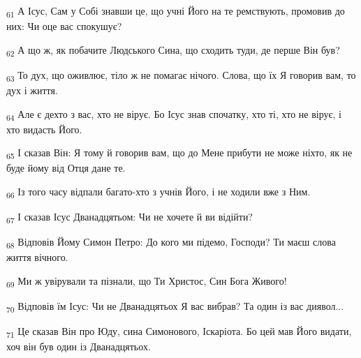 \begin{tcolorbox}
\textsubscript{61} А Ісус, Сам у Собі знавши це, що учні Його на те ремствують, промовив до них: Чи оце вас спокушує?
\end{tcolorbox}
\begin{tcolorbox}
\textsubscript{62} А що ж, як побачите Людського Сина, що сходить туди, де перше Він був?
\end{tcolorbox}
\begin{tcolorbox}
\textsubscript{63} То дух, що оживлює, тіло ж не помагає нічого. Слова, що їх Я говорив вам, то дух і життя.
\end{tcolorbox}
\begin{tcolorbox}
\textsubscript{64} Але є дехто з вас, хто не вірує. Бо Ісус знав спочатку, хто ті, хто не вірує, і хто видасть Його.
\end{tcolorbox}
\begin{tcolorbox}
\textsubscript{65} І сказав Він: Я тому й говорив вам, що до Мене прибути не може ніхто, як не буде йому від Отця дане те.
\end{tcolorbox}
\begin{tcolorbox}
\textsubscript{66} Із того часу відпали багато-хто з учнів Його, і не ходили вже з Ним.
\end{tcolorbox}
\begin{tcolorbox}
\textsubscript{67} І сказав Ісус Дванадцятьом: Чи не хочете й ви відійти?
\end{tcolorbox}
\begin{tcolorbox}
\textsubscript{68} Відповів Йому Симон Петро: До кого ми підемо, Господи? Ти маєш слова життя вічного.
\end{tcolorbox}
\begin{tcolorbox}
\textsubscript{69} Ми ж увірували та пізнали, що Ти Христос, Син Бога Живого!
\end{tcolorbox}
\begin{tcolorbox}
\textsubscript{70} Відповів їм Ісус: Чи не Дванадцятьох Я вас вибрав? Та один із вас диявол...
\end{tcolorbox}
\begin{tcolorbox}
\textsubscript{71} Це сказав Він про Юду, сина Симонового, Іскаріота. Бо цей мав Його видати, хоч він був один із Дванадцятьох.
\end{tcolorbox}
